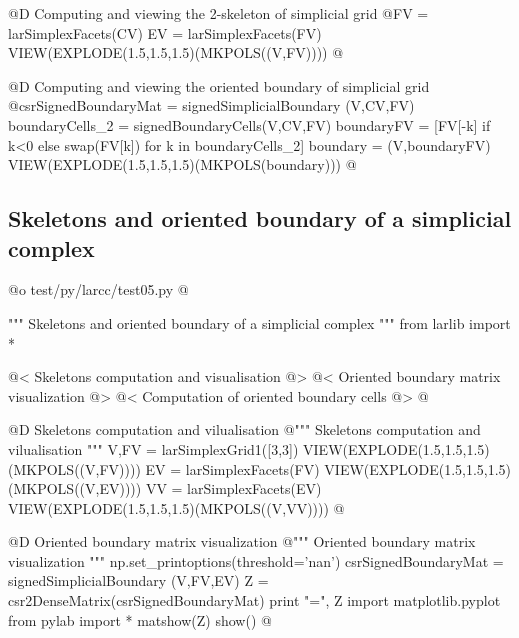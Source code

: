 \documentclass[11pt,oneside]{article}    %
\begin{document}
@D Computing and viewing the 2-skeleton of simplicial grid
@{FV = larSimplexFacets(CV)
EV = larSimplexFacets(FV)
VIEW(EXPLODE(1.5,1.5,1.5)(MKPOLS((V,FV))))
@}

@D Computing and viewing the oriented boundary of simplicial grid
@{csrSignedBoundaryMat = signedSimplicialBoundary (V,CV,FV)
boundaryCells_2 = signedBoundaryCells(V,CV,FV)
boundaryFV = [FV[-k] if k<0 else swap(FV[k]) for k in boundaryCells_2]
boundary = (V,boundaryFV)
VIEW(EXPLODE(1.5,1.5,1.5)(MKPOLS(boundary)))
@}


\subsection{Skeletons and oriented boundary of a simplicial complex}


@o test/py/larcc/test05.py
@{""" Skeletons and oriented boundary of a simplicial complex """
from larlib import *

@< Skeletons computation and visualisation @>
@< Oriented boundary matrix visualization @>
@< Computation of oriented boundary cells @>
@}


@D Skeletons computation and vilualisation
@{""" Skeletons computation and vilualisation """
V,FV = larSimplexGrid1([3,3])
VIEW(EXPLODE(1.5,1.5,1.5)(MKPOLS((V,FV))))
EV = larSimplexFacets(FV)
VIEW(EXPLODE(1.5,1.5,1.5)(MKPOLS((V,EV))))
VV = larSimplexFacets(EV)
VIEW(EXPLODE(1.5,1.5,1.5)(MKPOLS((V,VV))))
@}

@D Oriented boundary matrix visualization
@{""" Oriented boundary matrix visualization """
np.set_printoptions(threshold='nan')
csrSignedBoundaryMat = signedSimplicialBoundary (V,FV,EV)
Z = csr2DenseMatrix(csrSignedBoundaryMat)
print "\ncsrSignedBoundaryMat =\n", Z
import matplotlib.pyplot
from pylab import *
matshow(Z)
show()
@}
\end{document}
